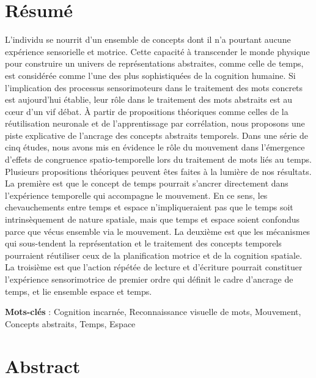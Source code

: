 \documentclass[
  a4paper,12pt,twoside,onecolumn,openright,final,oldfontcommands]{memoir}
\newcommand{\initial}[1]{
	\lettrine[lines=3,lhang=0.33,nindent=0em]{
		\color{gray}
     		{\textsc{#1}}}{}}
\newcommand\blankpage{%
    \null
    \thispagestyle{empty}%
    \newpage
    }
\begin{document}
\afterpage{\blankpage}

\chapter*{Résumé}

\initial{L}'individu se nourrit d'un ensemble de concepts dont il n'a pourtant aucune expérience sensorielle et motrice. Cette capacité à transcender le monde physique pour construire un univers de représentations abstraites, comme celle de temps, est considérée comme l'une des plus sophistiquées de la cognition humaine. Si l'implication des processus sensorimoteurs dans le traitement des mots concrets est aujourd'hui établie, leur rôle dans le traitement des mots abstraits est au cœur d'un vif débat. À partir de propositions théoriques comme celles de la réutilisation neuronale et de l'apprentissage par corrélation, nous proposons une piste explicative de l'ancrage des concepts abstraits temporels. Dans une série de cinq études, nous avons mis en évidence le rôle du mouvement dans l'émergence d'effets de congruence spatio-temporelle lors du traitement de mots liés au temps. Plusieurs propositions théoriques peuvent êtes faites à la lumière de nos résultats. La première est que le concept de temps pourrait s'ancrer directement dans l'expérience temporelle qui accompagne le mouvement. En ce sens, les chevauchements entre temps et espace n'impliqueraient pas que le temps soit intrinsèquement de nature spatiale, mais que temps et espace soient confondus parce que vécus ensemble via le mouvement. La deuxième est que les mécanismes qui sous-tendent la représentation et le traitement des concepts temporels pourraient réutiliser ceux de la planification motrice et de la cognition spatiale. La troisième est que l'action répétée de lecture et d'écriture pourrait constituer l'expérience sensorimotrice de premier ordre qui définit le cadre d'ancrage de temps, et lie ensemble espace et temps.

\vspace{\baselineskip}

\textbf{Mots-clés} : Cognition incarnée, Reconnaissance visuelle de mots, Mouvement, Concepts abstraits, Temps, Espace

\afterpage{\blankpage}

\chapter*{Abstract}
\end{document}
